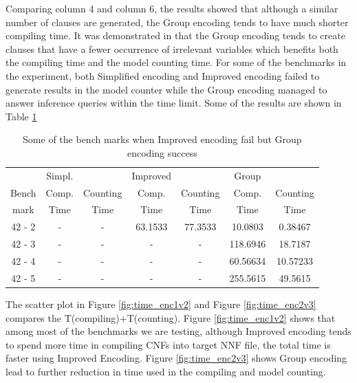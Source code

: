 \noindent Comparing column 4 and column 6, the results showed that although a similar number of clauses are generated, the Group encoding tends to have much shorter compiling time. It was demonstrated in \cite{2006-enc3} that the Group encoding tends to create clauses that have a fewer occurrence of irrelevant variables which benefits both the compiling time and the model counting time. For some of the benchmarks in the experiment, both Simplified encoding and Improved encoding failed to generate results in the model counter while the Group encoding managed to answer inference queries within the time limit. Some of the results are shown in Table \ref{tab:good Group encoding}\\
\begin{table}[]
\centering
\begin{tabular}{c|c c | c c | c c}
    \hline
    	&	Simpl.	&		&	Improved	&		&	Group	&		\\
    
	Bench		&	Comp. 	&	Counting 	&	Comp. 	&	Counting 	&	Comp. 	&	Counting 	\\
mark	&	Time	&	Time	&	Time	&	Time	&	Time	&	Time	\\
	\hline
	\hline
    42	-	2	&	-	&	-	& 63.1533 &	77.3533	&	10.0803	&	0.38467	\\
    42	-	3	&	-	&	-	&	-	&	-	&	118.6946	&	18.7187	\\
    42	-	4	&	-	&	-	&	-	&	-	&	60.56634	&	10.57233	\\
    42	-	5	&	-	&	-	&	-	&	-	&	255.5615	&	49.5615	\\
    \hline
\end{tabular}
\caption{Some of the bench marks when Improved encoding fail but Group encoding success}
    \label{tab:good Group encoding}
\end{table}

\noindent The scatter plot in Figure \ref{fig:time_enc1v2} and Figure \ref{fig:time_enc2v3} compares the T(compiling)+T(counting). Figure \ref{fig:time_enc1v2} shows that among most of the benchmarks we are testing, although Improved encoding tends to spend more time in compiling CNFs into target NNF file, the total time is faster using Improved Encoding. Figure \ref{fig:time_enc2v3} shows Group encoding lead to further reduction in time used in the compiling and model counting.\\

